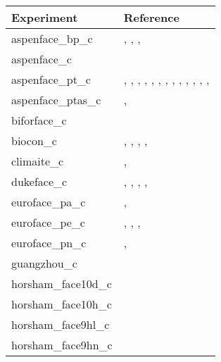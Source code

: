 \begin{table}[ht]
\small
\centering
\begin{tabular}{p{5cm}p{7cm}}
  \hline
Experiment & Reference \\ 
  \hline
aspenface\_bp\_c & \cite{darbah_et_al_2010b}, \cite{karnosky_et_al_2003}, \cite{riikonen_et_al_2008}, \cite{uddling_et_al_2009}   \\
  aspenface\_c & \cite{monson_et_al_2007}   \\
  aspenface\_pt\_c & \cite{noormets_et_al_2001}, \cite{calfapietra_et_al_2007}, \cite{calfapietra_et_al_2008}, \cite{cseke_et_al_2009}, \cite{darbah_et_al_2010a}, \cite{darbah_et_al_2010b}, \cite{karnosky_et_al_2003}, \cite{kets_et_al_2010}, \cite{noormets_et_al_2010}, \cite{riikonen_et_al_2008}, \cite{sharma_et_al_2003}, \cite{takeuchi_et_al_2001}, \cite{taylor_et_al_2007}, \cite{uddling_et_al_2009}   \\
  aspenface\_ptas\_c & \cite{karnosky_et_al_2003}, \cite{sharma_et_al_2003}   \\
  biforface\_c & \cite{gardner_et_al_2021}   \\
  biocon\_c & \cite{tjoelker_et_al_2005}, \cite{crous_et_al_2010}, \cite{lee_et_al_2001}, \cite{lee_et_al_2011}, \cite{strengbom_and_reich_2006}   \\
  climaite\_c & \cite{albert_et_al_2011a}, \cite{boesgaard_and_ro-poulsen_2013}   \\
  dukeface\_c & \cite{herrick_and_thomas_1998}, \cite{logan_et_al_2009}, \cite{naumburg_and_ellsworth_2000}, \cite{springer_and_thomas_2006}, \cite{springer_et_al_2005}   \\
  euroface\_pa\_c & \cite{bernacchi_et_al_2003}, \cite{hovenden_2003}   \\
  euroface\_pe\_c & \cite{bernacchi_et_al_2003}, \cite{calfapietra_et_al_2004}, \cite{hovenden_2003}, \cite{tricker_et_al_2005}   \\
  euroface\_pn\_c & \cite{bernacchi_et_al_2003}, \cite{hovenden_2003}   \\
  guangzhou\_c & \cite{liu_et_al_2011}   \\
  horsham\_face10d\_c & \cite{tausz-posch_et_al_2013a}   \\
  horsham\_face10h\_c & \cite{tausz-posch_et_al_2013a}   \\
  horsham\_face9hl\_c & \cite{tausz-posch_et_al_2013a}   \\
  horsham\_face9hn\_c & \cite{tausz-posch_et_al_2013a}   \\

\end{tabular}
\end{table}
